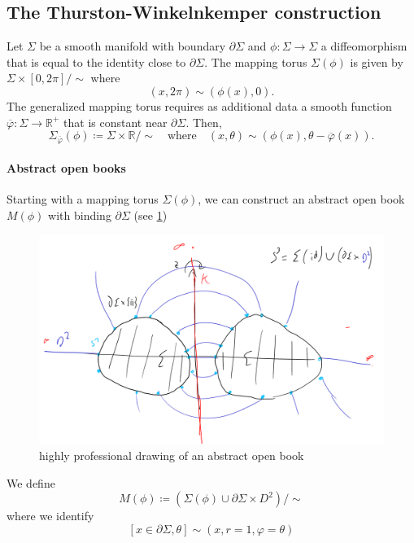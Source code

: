 \subsection*{The Thurston-Winkelnkemper construction}
\begin{definition}
    Let $\Sigma$ be a smooth manifold with boundary $\partial \Sigma$ and $\phi: \Sigma \to \Sigma$ a diffeomorphism that is equal to the identity close to $\partial \Sigma$.
    The mapping torus $\Sigma(\phi)$ is given by
     $\Sigma \times [0,2\pi]/\sim$ where
     \[
        (x, 2\pi) \sim (\phi(x), 0). 
     \]
     The generalized mapping torus requires as additional data a smooth function $\overline{\varphi}: \Sigma \to \mathbb R^+$ that is constant near $\partial \Sigma$. Then,
     \[
        \Sigma_{\overline{\varphi}}(\phi) \coloneqq \Sigma \times \mathbb R/\sim \quad \text{where} \quad  (x, \theta) \sim (\phi(x), \theta - \overline{\varphi}(x)).
     \]
\end{definition}

\paragraph*{Abstract open books}
Starting with a mapping torus $\Sigma(\phi)$, we can construct an abstract open book $M(\phi)$ with binding $\partial \Sigma$ (see \cref{fig:abstract_open_book})
\begin{figure}[ht]
    \includegraphics*[width=\textwidth]{images/abstract_open_book.png}
    \caption[abstract open book]{highly professional drawing of an abstract open book}
    \label{fig:abstract_open_book}
\end{figure}

We define
\[
    M(\phi) \coloneqq \left(\Sigma(\phi) \cup \partial \Sigma \times D^2\right)/\sim
\]
where we identify
\[
    [x \in \partial \Sigma, \theta] \sim (x, r=1, \varphi = \theta)  
\]


